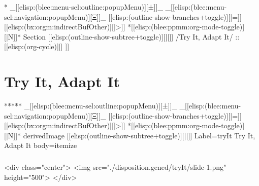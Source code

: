 \begin{whenOrg}
\begin{verblatex}
\begin{frame}[fragile,plain,label=observations]

\end{frame}
\end{verblatex}



\begin{whenOrg}
*  _[[elisp:(blee:menu-sel:outline:popupMenu)][±]]_ _[[elisp:(blee:menu-sel:navigation:popupMenu)][Ξ]]_ [[elisp:(outline-show-branches+toggle)][|=]] [[elisp:(bx:orgm:indirectBufOther)][|>]] *[[elisp:(blee:ppmm:org-mode-toggle)][|N]]*  Section    [[elisp:(outline-show-subtree+toggle)][||]]   /Try It, Adapt It/ ::  [[elisp:(org-cycle)][| ]]
\end{whenOrg}

\section{Try It, Adapt It}

\begin{whenOrg}
*****  _[[elisp:(blee:menu-sel:outline:popupMenu)][±]]_ _[[elisp:(blee:menu-sel:navigation:popupMenu)][Ξ]]_ [[elisp:(outline-show-branches+toggle)][|=]] [[elisp:(bx:orgm:indirectBufOther)][|>]] *[[elisp:(blee:ppmm:org-mode-toggle)][|N]]*  derivedImage [[elisp:(outline-show-subtree+toggle)][||]] Label=tryIt Try It, Adapt It body=itemize
\end{whenOrg}

\begin{htmlonly}

\begin{frame}[fragile,plain,label=tryIt]
    \frametitle{}
    \framesubtitle{}
    \begin{rawhtml}
<div class="center">
<img src="./disposition.gened/tryIt/slide-1.png" height="500">
</div>
    \end{rawhtml}
\end{frame}
\end{htmlonly}


\end{whenOrg}
